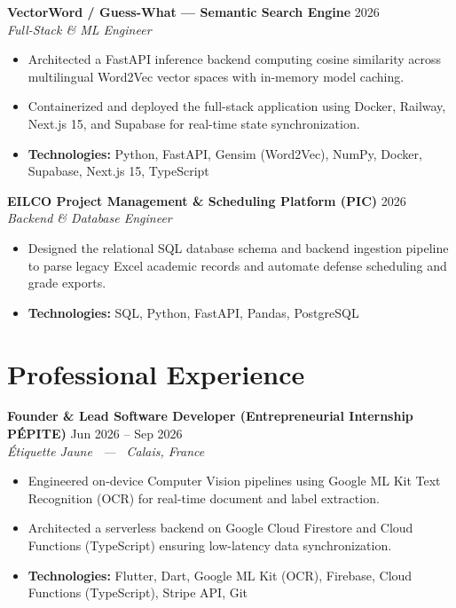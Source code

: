 \documentclass[10pt,a4paper]{article}
\begin{document}
\noindent
\textbf{VectorWord / Guess-What — Semantic Search Engine} \hfill 2026 \\
\textit{Full-Stack \& ML Engineer}
\begin{itemize}

    \item Architected a FastAPI inference backend computing cosine similarity across multilingual Word2Vec vector spaces with in-memory model caching.

    \item Containerized and deployed the full-stack application using Docker, Railway, Next.js 15, and Supabase for real-time state synchronization.


    \item \textbf{Technologies:} Python, FastAPI, Gensim (Word2Vec), NumPy, Docker, Supabase, Next.js 15, TypeScript

\end{itemize}
\vspace{0.25em}

\noindent
\textbf{EILCO Project Management \& Scheduling Platform (PIC)} \hfill 2026 \\
\textit{Backend \& Database Engineer}
\begin{itemize}

    \item Designed the relational SQL database schema and backend ingestion pipeline to parse legacy Excel academic records and automate defense scheduling and grade exports.


    \item \textbf{Technologies:} SQL, Python, FastAPI, Pandas, PostgreSQL

\end{itemize}
\vspace{0.25em}


\section{Professional Experience}

\noindent
\textbf{Founder \& Lead Software Developer (Entrepreneurial Internship PÉPITE)} \hfill Jun 2026 – Sep 2026 \\
\textit{Étiquette Jaune \ --- \ Calais, France}
\begin{itemize}

    \item Engineered on-device Computer Vision pipelines using Google ML Kit Text Recognition (OCR) for real-time document and label extraction.

    \item Architected a serverless backend on Google Cloud Firestore and Cloud Functions (TypeScript) ensuring low-latency data synchronization.


    \item \textbf{Technologies:} Flutter, Dart, Google ML Kit (OCR), Firebase, Cloud Functions (TypeScript), Stripe API, Git

\end{itemize}
\vspace{0.25em}
\end{document}
